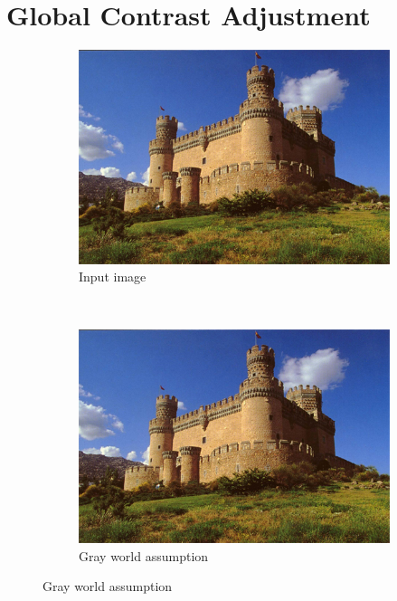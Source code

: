 \documentclass[a4paper]{article}
\begin{document}
\section{Global Contrast Adjustment}
\begin{figure}[H]
	\begin{subfigure}[h]{0.48\textwidth}
		\centering
		\includegraphics[width=\textwidth]{linearContrast_input1}
		\caption*{Input image}
	\end{subfigure}
	~
	\begin{subfigure}[h]{0.48\textwidth}
		\centering
		\includegraphics[width=\textwidth]{linearContrast_output1}
		\caption*{Gray world assumption}
	\end{subfigure}
	

\end{figure}
\end{document}

